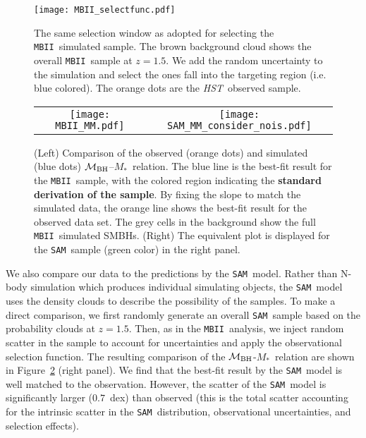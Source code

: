\documentclass{natureprintstyle}
\newcommand{\hst}{{\it HST}}
\newcommand{\mbh}{$\mathcal M_{\rm BH}$}
\newcommand{\mstar}{{$M_*$}}
\newcommand{\sam}{\texttt{SAM}}
\newcommand{\mbii}{\texttt{MBII}}
\newcommand{\ding}[1]{\textcolor{red}{[{\bf Xuheng}: #1]}}
\begin{document}
\begin{figure}[t]
\texttt{[image: MBII\_selectfunc.pdf]}
\caption{The same selection window as adopted for selecting the \mbii\ simulated sample. The brown background cloud shows the overall \mbii\ sample at $z=1.5$. We add the random uncertainty to the simulation and select the ones fall into the targeting region (i.e. blue colored). The orange dots are the \hst\ observed sample.}
\label{fig:selectfunc}
\end{figure}

\begin{figure*}[t]%
\begin{tabular}{c c}
\texttt{[image: MBII\_MM.pdf]} &
\texttt{[image: SAM\_MM\_consider\_nois.pdf]} \\
\end{tabular}
\caption{(Left) Comparison of the observed (orange dots) and simulated (blue dots) \mbh--\mstar\ relation. The blue line is the best-fit result for the \mbii\ sample, with the colored region indicating the {\bf standard derivation of the sample}. By fixing the slope to match the simulated data, the orange line shows the best-fit result for the observed data set. The grey cells in the background show the full \mbii\ simulated SMBHs. (Right) The equivalent plot is displayed for the \sam\ sample (green color) in the right panel.}
\label{fig:MM_comp}
\end{figure*}

We also compare our data to the predictions by the \sam\ model. Rather than N-body simulation which produces individual simulating objects, the \sam\ model uses the density clouds to describe the possibility of the samples. 
To make a direct comparison, we first randomly generate an overall \sam\ sample based on the probability clouds at $z=1.5$. Then, as in the \mbii\ analysis, we inject random scatter in the sample to account for uncertainties and apply the observational selection function. The resulting comparison of the  \mbh-\mstar\ relation are shown in Figure~\ref{fig:MM_comp} (right panel). We find that the best-fit result by the \sam\ model is well matched to the observation. However, the scatter of the \sam\ model is significantly larger ($0.7$~dex) than observed (this is the total scatter accounting for the intrinsic scatter in the \sam\ distribution, observational uncertainties, and selection effects).  
\end{document}
